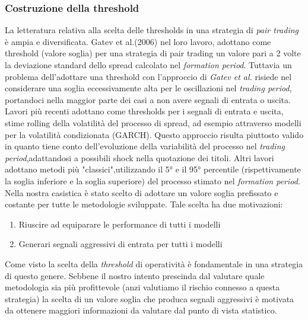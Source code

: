 \documentclass[]{article}
\begin{document}
\subsubsection{Costruzione della threshold}
La letteratura relativa alla scelta delle thresholds in una strategia di \textit{pair trading} è ampia e diversificata.
Gatev et al.(2006) nel loro lavoro, adottano come threshold (valore soglia) per una strategia di pair trading un valore pari a 2 volte la deviazione standard dello spread calcolato nel \textit{formation period}.
Tuttavia un problema dell'adottare una threshold con l'approccio di \textit{Gatev et al.} risiede nel considerare una soglia eccessivamente alta per le oscillazioni nel \textit{trading period}, portandoci nella maggior parte dei casi a non avere segnali di entrata o uscita.
Lavori più recenti adottano come thresholds per i segnali di entrata e uscita, stime rolling della volatilità del processo di spread, ad esempio attraverso modelli per la volatilità condizionata (GARCH).
Questo approccio risulta piuttosto valido in quanto tiene conto dell'evoluzione della variabilità del processo nel \textit{trading period},adattandosi a possibili shock nella quotazione dei titoli.
Altri lavori adottano metodi più "classici",utilizzando il 5° e il 95° percentile (rispettivamente la soglia inferiore e la soglia superiore) del processo stimato nel \textit{formation period}.
Nella nostra casistica è stato scelto di adottare un valore soglia prefissato e costante per tutte le metodologie sviluppate.
Tale scelta ha due motivazioni:
\begin{enumerate}
	\item Riuscire ad equiparare le performance di tutti i modelli
	\item Generari segnali aggressivi di entrata per tutti i modelli
\end{enumerate}

Come visto la scelta della \textit{threshold} di operatività è fondamentale in una strategia di questo genere. Sebbene il nostro intento prescinda dal valutare quale metodologia sia più profittevole (anzi valutiamo il rischio connesso a questa strategia) la scelta di un valore soglia che produca segnali aggressivi è motivata da ottenere maggiori informazioni da valutare dal punto di vista statistico.
\end{document}

